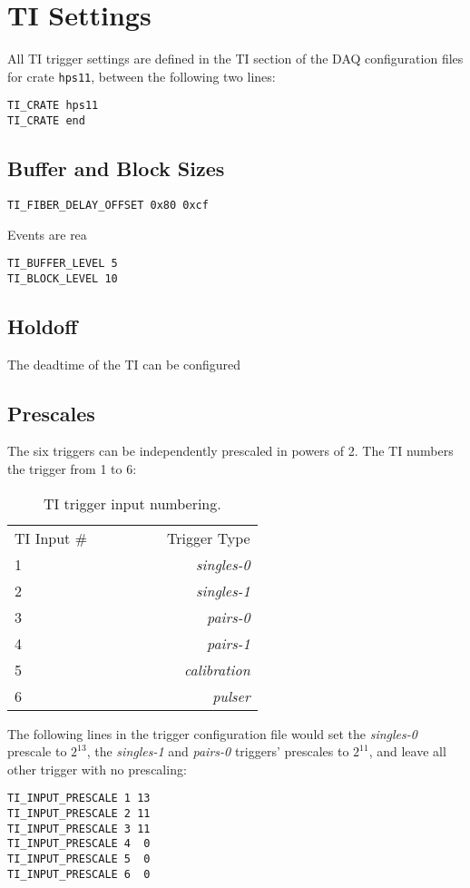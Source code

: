 \documentclass[amsmath,amssymb,notitlepage,11pt]{revtex4-1}
\begin{document}
\section{TI Settings}
All TI trigger settings are defined in the TI section of the DAQ configuration files for crate \texttt{hps11}, between the following two lines:
\begin{verbatim}
TI_CRATE hps11
TI_CRATE end
\end{verbatim}

\subsection{Buffer and Block Sizes}
\begin{verbatim}
TI_FIBER_DELAY_OFFSET 0x80 0xcf
\end{verbatim}

Events are rea
\begin{verbatim}
TI_BUFFER_LEVEL 5
TI_BLOCK_LEVEL 10
\end{verbatim}

\subsection{Holdoff}
The deadtime of the TI can be configured 

\subsection{Prescales}
The six triggers can be independently prescaled in powers of 2.  The TI numbers the trigger from 1 to 6:
\begin{table}[htbp]\centering
  \begin{tabular}{lr}\toprule[1.5pt]
    TI Input \#\ \ \ \ \ \ \ \ \  & Trigger Type \\ \cmidrule[0.5pt]{1-2}
    1 & {\em singles-0} \\
    2 & {\em singles-1} \\
    3 & {\em pairs-0} \\
    4 & {\em pairs-1} \\
    5 & {\em calibration} \\
    6 & {\em pulser} \\
  \bottomrule[1.5pt]
  \end{tabular}
  \caption{TI trigger input numbering.}
\end{table}

The following lines in the trigger configuration file would set the {\em singles-0} prescale to $2^{13}$, the {\em singles-1} and {\em pairs-0} triggers' prescales to $2^{11}$, and leave all other trigger with no prescaling: 
\begin{verbatim}
TI_INPUT_PRESCALE 1 13
TI_INPUT_PRESCALE 2 11
TI_INPUT_PRESCALE 3 11
TI_INPUT_PRESCALE 4  0
TI_INPUT_PRESCALE 5  0
TI_INPUT_PRESCALE 6  0
\end{verbatim}
\end{document}
